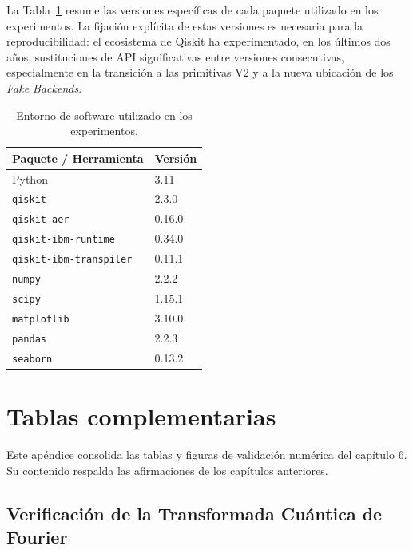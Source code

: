\documentclass[12pt, spanish]{book}
\begin{document}
La Tabla~\ref{tab:entorno_software} resume las versiones específicas de cada paquete utilizado en los experimentos. La fijación explícita de estas versiones es necesaria para la reproducibilidad: el ecosistema de Qiskit ha experimentado, en los últimos dos años, sustituciones de API significativas entre versiones consecutivas, especialmente en la transición a las primitivas V2 y a la nueva ubicación de los \textit{Fake Backends}.

\begin{table}[H]
    \centering
    \caption{Entorno de software utilizado en los experimentos.\\}
    \label{tab:entorno_software}
    \begin{tabular}{ll}
        \toprule
        \textbf{Paquete / Herramienta}           & \textbf{Versión} \\
        \midrule
        Python                                   & 3.11   \\
        \texttt{qiskit}                          & 2.3.0  \\
        \texttt{qiskit-aer}                      & 0.16.0 \\
        \texttt{qiskit-ibm-runtime}              & 0.34.0 \\
        \texttt{qiskit-ibm-transpiler}           & 0.11.1 \\
        \texttt{numpy}                           & 2.2.2  \\
        \texttt{scipy}                           & 1.15.1 \\
        \texttt{matplotlib}                      & 3.10.0 \\
        \texttt{pandas}                          & 2.2.3  \\
        \texttt{seaborn}                         & 0.13.2 \\
        \bottomrule
    \end{tabular}
\end{table}

\chapter{Tablas complementarias}
\label{app:caracterizacion-bloques}

Este apéndice consolida las tablas y figuras de validación numérica del capítulo 6. Su contenido respalda las afirmaciones de los capítulos anteriores.

\section{Verificación de la Transformada Cuántica de Fourier}
\end{document}
